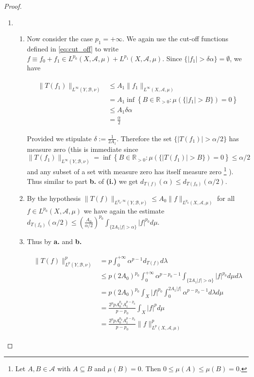 \begin{proof}
\begin{enumerate}[label = \textbf{(\roman*.)}]
\item
	\begin{enumerate}[label = \textbf{\alph*.}]
		\item Now consider the case \underline{$p_1 = + \infty$}. We again use the cut-off functions defined in \ref{eq:cut_off} to write $f \equiv f_0 + f_1 \in L^{p_0}(X,\mathcal{A},\mu) + L^{p_1}(X,\mathcal{A},\mu)$.  Since $\{\vert f_1\vert > \delta\alpha \} = \emptyset$, we have 

\begin{gather}
\begin{aligned}
\|T(f_1)\|_{L^\infty(Y,\mathcal{B},\nu)} &\leqslant A_1 \|f_1\|_{L^\infty(X,\mathcal{A},\mu)}\\
&= A_1 \inf \left\{B \in \mathbb{R}_{>0}: \mu(\{\vert f_1 \vert > B\}) = 0 \right\}\\
&\leqslant A_1\delta\alpha\\
&= \frac{\alpha}{2}
\end{aligned}
\end{gather}

Provided we stipulate $\delta := \frac{1}{2A_1}$. Therefore the set $\{\vert T(f_1) \vert > \alpha/2\}$ has measure zero (this is immediate since $\|T(f_1)\|_{L^\infty(Y,\mathcal{B},\nu)} =  \inf \left\{B \in \mathbb{R}_{>0}: \mu(\{\vert T(f_1) \vert > B\}) = 0 \right\} \leqslant \alpha/2 $ and any subset of a set with measure zero has itself measure zero
\footnote{Let $A,B \in \mathcal{A}$ with $A \subseteq B$ and $\mu(B) = 0$. Then $0 \leqslant \mu(A) \leqslant \mu (B) = 0$.}
). Thus similar to part \textbf{b.} of \textbf{(i.)} we get $d_{T(f)}(\alpha) \leqslant d_{T(f_0)}(\alpha/2)$.

	\item By the hypothesis $\|T(f)\|_{L^{p_0,\infty}(Y,\mathcal{B},\nu)}\leqslant A_0 \|f\|_{L^{p_0}(X,\mathcal{A},\mu)}$ for all $f \in L^{p_0}(X,\mathcal{A},\mu)$ we have again  the estimate $\displaystyle d_{T(f_0)}(\alpha/2) \leqslant \left(\frac{A_0}{\alpha/2}\right)^{p_0} \int_{\{2A_1\vert f \vert > \alpha\}} \vert f \vert^{p_0}d\mu$.

	\item Thus by \textbf{a.} and \textbf{b.}

	\begin{gather}
		\begin{aligned}
			\|T(f)\|_{L^p(Y,\mathcal{B},\nu)}^p &= p \int_0^{+ \infty} \alpha^{p-1}d_{T(f)} d\lambda\\
			&\leqslant p (2A_0)^{p_0} \int_0^{+ \infty} \alpha^{p-p_0-1} \int_{\{2A_1\vert f \vert > \alpha\}} \vert f \vert^{p_0}d\mu d\lambda\\
			&= p(2A_0)^{p_0} \int_X \vert f\vert^{p_0} \int_0^{2A_1\vert f \vert} \alpha^{p - p_0 - 1}d\lambda d\mu\\
			&= \frac{2^ppA_0^{p_0}A_1^{p - p_0}}{p - p_0} \int_X \vert f\vert^{p} d\mu\\
			&= \frac{2^ppA_0^{p_0}A_1^{p - p_0}}{p - p_0} \|f\|_{L^p(X,\mathcal{A},\mu)}^p
			\label{est:p_1_infty}
		\end{aligned}
	\end{gather}


\end{enumerate}
\end{enumerate}
\end{proof}
